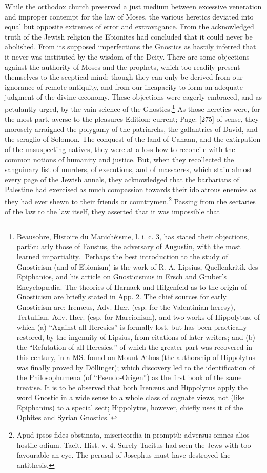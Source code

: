 While the orthodox church preserved a just medium between excessive veneration and improper contempt for the law of Moses, the various heretics deviated into equal but opposite extremes of error and extravagance. From the acknowledged truth of the Jewish religion the Ebionites had concluded that it could never be abolished. From its supposed imperfections the Gnostics as hastily inferred that it never was instituted by the wisdom of the Deity. There are some objections against the authority of Moses and the prophets, which too readily present themselves to the sceptical mind; though they can only be derived from our ignorance of remote antiquity, and from our incapacity to form an adequate judgment of the divine œconomy. These objections were eagerly embraced, and as petulantly urged, by the vain science of the Gnostics.\footnote{Beausobre, Histoire du Manichéisme, l. i. c. 3, has stated their objections, particularly those of Faustus, the adversary of Augustin, with the most learned impartiality. [Perhaps the best introduction to the study of Gnosticism (and of Ebionism) is the work of R. A. Lipsius, Quellenkritik des Epiphanios, and his article on Gnosticismus in Ersch and Gruber\texthebrew{}’s Encyclopædia. The theories of Harnack and Hilgenfeld as to the origin of Gnosticism are briefly stated in App. 2. The chief sources for early Gnosticism are: Irenæus, Adv. Hær. (esp. for the Valentinian heresy), Tertullian, Adv. Hær. (esp. for Marcionism), and two works of Hippolytus, of which (a) \texthebrew{“}Against all Heresies\texthebrew{}” is formally lost, but has been practically restored, by the ingenuity of Lipsius, from citations of later writers; and (b) the \texthebrew{“}Refutation of all Heresies,\texthebrew{}” of which the greater part was recovered in this century, in a MS. found on Mount Athos (the authorship of Hippolytus was finally proved by Döllinger); which discovery led to the identification of the Philosophumena (of \texthebrew{“}Pseudo-Origen\texthebrew{}”) as the first book of the same treatise. It is to be observed that both Irenæus and Hippolytus apply the word Gnostic in a wide sense to a whole class of cognate views, not (like Epiphanius) to a special sect; Hippolytus, however, chiefly uses it of the Ophites and Syrian Gnostics.]} As those heretics were, for the most part, averse to the pleasures Edition: current; Page: [275] of sense, they morosely arraigned the polygamy of the patriarchs, the gallantries of David, and the seraglio of Solomon. The conquest of the land of Canaan, and the extirpation of the unsuspecting natives, they were at a loss how to reconcile with the common notions of humanity and justice. But, when they recollected the sanguinary list of murders, of executions, and of massacres, which stain almost every page of the Jewish annals, they acknowledged that the barbarians of Palestine had exercised as much compassion towards their idolatrous enemies as they had ever shewn to their friends or countrymen.\footnote{Apud ipsos fides obstinata, misericordia in promptû: adversus omnes alios hostile odium. Tacit. Hist. v. 4. Surely Tacitus had seen the Jews with too favourable an eye. The perusal of Josephus must have destroyed the antithesis.} Passing from the sectaries of the law to the law itself, they asserted that it was impossible that 
